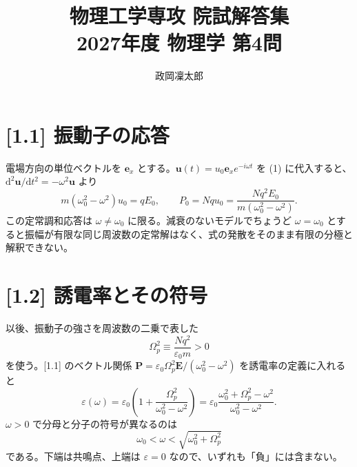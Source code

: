 \documentclass[11pt,a4paper]{article}
\title{物理工学専攻 院試解答集\\2027年度 物理学 第4問}
\author{政岡凜太郎}
\date{}
\begin{document}
\maketitle

\section*{[1.1] 振動子の応答}
電場方向の単位ベクトルを $\boldsymbol e_x$ とする。$\boldsymbol u(t)=u_0\boldsymbol e_xe^{-i\omega t}$ を (1) に代入すると、$\mathrm d^2\boldsymbol u/\mathrm dt^2=-\omega^2\boldsymbol u$ より
\begin{equation}
m(\omega_0^2-\omega^2)u_0=qE_0,
\qquad
\boxed{P_0=Nqu_0=\frac{Nq^2E_0}{m(\omega_0^2-\omega^2)}}.
\end{equation}
この定常調和応答は $\omega\ne\omega_0$ に限る。減衰のないモデルでちょうど $\omega=\omega_0$ とすると振幅が有限な同じ周波数の定常解はなく、式の発散をそのまま有限の分極と解釈できない。

\section*{[1.2] 誘電率とその符号}
以後、振動子の強さを周波数の二乗で表した
\begin{equation}
\Omega_p^2\equiv\frac{Nq^2}{\varepsilon_0m}>0
\end{equation}
を使う。[1.1] のベクトル関係 $\boldsymbol P=\varepsilon_0\Omega_p^2\boldsymbol E/(\omega_0^2-\omega^2)$ を誘電率の定義に入れると
\begin{equation}
\boxed{\varepsilon(\omega)=\varepsilon_0\left(1+\frac{\Omega_p^2}{\omega_0^2-\omega^2}\right)
=\varepsilon_0\frac{\omega_0^2+\Omega_p^2-\omega^2}{\omega_0^2-\omega^2}}.
\end{equation}
$\omega>0$ で分母と分子の符号が異なるのは
\begin{equation}
\boxed{\omega_0<\omega<\sqrt{\omega_0^2+\Omega_p^2}}
\end{equation}
である。下端は共鳴点、上端は $\varepsilon=0$ なので、いずれも「負」には含まない。
\end{document}
